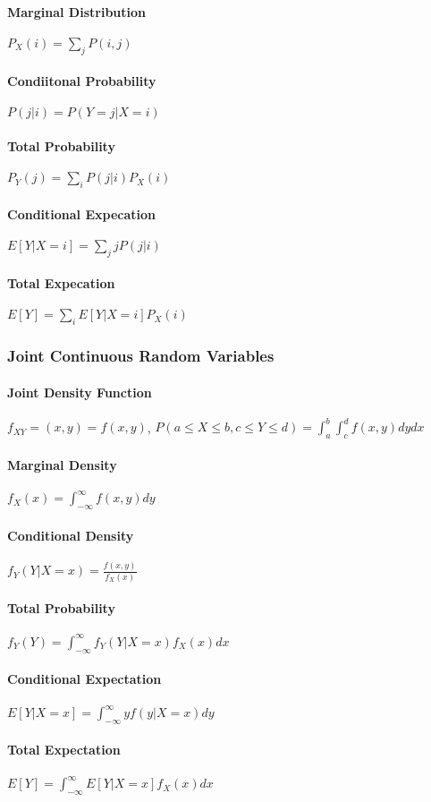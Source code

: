 \paragraph{Marginal Distribution} $P_X(i) = \sum_{j} P(i,j)$
\paragraph{Condiitonal Probability} $P(j|i) = P(Y=j|X=i)$
\paragraph{Total Probability} $P_Y(j) = \sum_i P(j|i)P_X(i)$
\paragraph{Conditional Expecation} $E[Y|X=i] = \sum_j j P(j|i)$
\paragraph{Total Expecation} $E[Y] = \sum_i E[Y|X=i] P_X(i)$
\subsubsection{Joint Continuous Random Variables}
\paragraph{Joint Density Function}
$f_{XY}=(x,y) = f(x,y)$, 
$P(a \le X \le b, c \le Y \le d) = \int_a^b \int_c^d f(x,y) dy dx$
\paragraph{Marginal Density}
$f_X(x) = \int_{-\infty}^{\infty} f(x,y) dy$
\paragraph{Conditional Density}
$f_Y(Y|X=x) = \frac{f(x,y)}{f_X(x)}$
\paragraph{Total Probability}
$f_Y(Y) = \int_{-\infty}^{\infty} f_Y(Y|X=x) f_X(x) dx$
\paragraph{Conditional Expectation}
$E[Y|X=x] = \int_{-\infty}^{\infty} y f(y|X=x) dy$
\paragraph{Total Expectation}
$E[Y] = \int_{-\infty}^{\infty} E[Y|X=x] f_X(x) dx$
